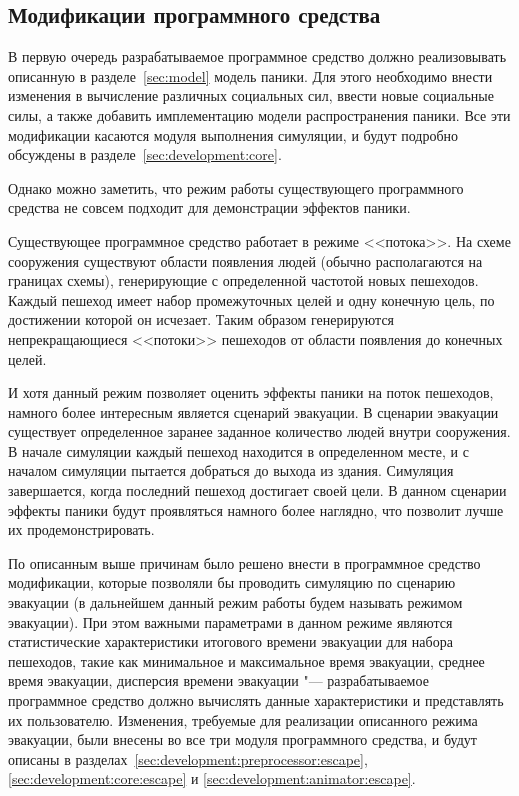 \subsection{Модификации программного средства}
\label{sec:development:common}

В первую очередь разрабатываемое программное средство должно реализовывать описанную в разделе~\ref{sec:model} модель паники.
Для этого необходимо внести изменения в вычисление различных социальных сил, ввести новые социальные силы,
а также добавить имплементацию модели распространения паники.
Все эти модификации касаются модуля выполнения симуляции, и будут подробно обсуждены в разделе~\ref{sec:development:core}.

Однако можно заметить, что режим работы существующего программного средства не совсем подходит для демонстрации эффектов паники.

Существующее программное средство работает в режиме <<потока>>.
На схеме сооружения существуют области появления людей (обычно располагаются на границах схемы),
генерирующие с определенной частотой новых пешеходов.
Каждый пешеход имеет набор промежуточных целей и одну конечную цель, по достижении которой он исчезает.
Таким образом генерируются непрекращающиеся <<потоки>> пешеходов от области появления до конечных целей.

И хотя данный режим позволяет оценить эффекты паники на поток пешеходов, намного более интересным является сценарий эвакуации.
В сценарии эвакуации существует определенное заранее заданное количество людей внутри сооружения.
В начале симуляции каждый пешеход находится в определенном месте, и с началом симуляции пытается добраться до выхода из здания.
Симуляция завершается, когда последний пешеход достигает своей цели.
В данном сценарии эффекты паники будут проявляться намного более наглядно, что позволит лучше их продемонстрировать.

По описанным выше причинам было решено внести в программное средство модификации,
которые позволяли бы проводить симуляцию по сценарию эвакуации
(в дальнейшем данный режим работы будем называть режимом эвакуации).
При этом важными параметрами в данном режиме являются статистические характеристики
итогового времени эвакуации для набора пешеходов, такие как минимальное и максимальное время эвакуации,
среднее время эвакуации, дисперсия времени эвакуации "---
разрабатываемое программное средство должно вычислять данные характеристики и представлять их пользователю.
Изменения, требуемые для реализации описанного режима эвакуации, были внесены во все три модуля программного средства,
и будут описаны в разделах~\ref{sec:development:preprocessor:escape}, \ref{sec:development:core:escape} и \ref{sec:development:animator:escape}.


